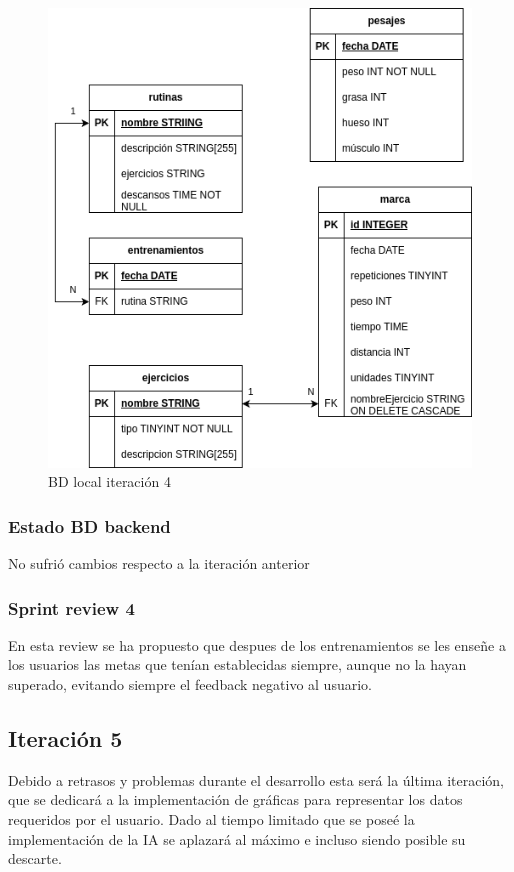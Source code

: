 \begin{figure}[H]
    \centering
    \includegraphics[width=\textwidth]{fotos/BDL iteracion 4.png}
    \caption{BD local iteración 4}
    \label{fig:BDL iteracion 4}
\end{figure}

\subsubsection{Estado BD backend}

No sufrió cambios respecto a la iteración anterior

\subsubsection{Sprint review 4}

En esta review se ha propuesto que despues de los entrenamientos se les enseñe a los usuarios las metas que tenían establecidas siempre, aunque no la hayan superado, evitando siempre el feedback negativo al usuario.

\subsection{Iteraci\'on 5} %

Debido a retrasos y problemas durante el desarrollo esta será la última iteración, que se dedicará a la implementación de gráficas para representar los datos requeridos por el usuario. Dado al tiempo limitado que se poseé la implementación de la IA se aplazará al máximo e incluso siendo posible su descarte.
